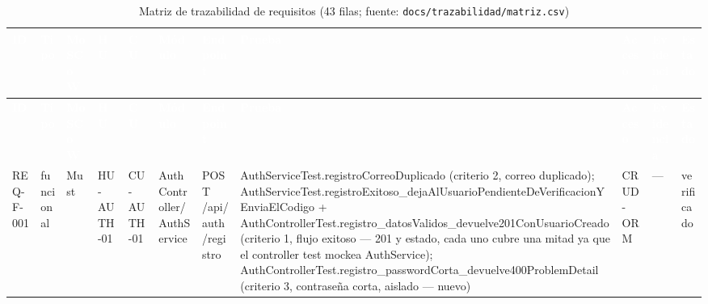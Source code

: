 \begin{landscape}
\begin{center}
\tiny
\renewcommand{\arraystretch}{1.05}
\setlength{\tabcolsep}{1pt}
\begin{longtable}{|p{1.2cm}|p{1.2cm}|p{1.35cm}|p{1.8cm}|p{1.5cm}|p{2.2cm}|p{2.3cm}|p{2.8cm}|p{1.8cm}|p{2.4cm}|p{1.8cm}|}
\caption{Matriz de trazabilidad de requisitos (43 filas; fuente:
  \texttt{docs/trazabilidad/matriz.csv})}
\label{tab:anexo-matriz}\\
\hline
\rowcolor{verdeuteq}
\textcolor{white}{\textbf{ID}} &
\textcolor{white}{\textbf{Tipo}} &
\textcolor{white}{\textbf{MoSCoW}} &
\textcolor{white}{\textbf{HU}} &
\textcolor{white}{\textbf{CU}} &
\textcolor{white}{\textbf{Módulo}} &
\textcolor{white}{\textbf{Endpoint}} &
\textcolor{white}{\textbf{Prueba}} &
\textcolor{white}{\textbf{Acceso}} &
\textcolor{white}{\textbf{Evidencia}} &
\textcolor{white}{\textbf{Estado}} \\
\hline
\endfirsthead
\hline
\rowcolor{verdeuteq}
\textcolor{white}{\textbf{ID}} &
\textcolor{white}{\textbf{Tipo}} &
\textcolor{white}{\textbf{MoSCoW}} &
\textcolor{white}{\textbf{HU}} &
\textcolor{white}{\textbf{CU}} &
\textcolor{white}{\textbf{Módulo}} &
\textcolor{white}{\textbf{Endpoint}} &
\textcolor{white}{\textbf{Prueba}} &
\textcolor{white}{\textbf{Acceso}} &
\textcolor{white}{\textbf{Evidencia}} &
\textcolor{white}{\textbf{Estado}} \\
\hline
\endhead
\hline
\endfoot
REQ-F-001 & funcional & Must & HU-AUTH-01 & CU-AUTH-01 & Auth\allowbreak Controller/\allowbreak Auth\allowbreak Service & POST /\allowbreak api/\allowbreak auth/\allowbreak registro & Auth\allowbreak Service\allowbreak Test.\allowbreak registro\allowbreak Correo\allowbreak Duplicado (criterio 2, correo duplicado); Auth\allowbreak Service\allowbreak Test.\allowbreak registro\allowbreak Exitoso\_\allowbreak deja\allowbreak Al\allowbreak Usuario\allowbreak Pendiente\allowbreak De\allowbreak Verificacion\allowbreak YEnvia\allowbreak El\allowbreak Codigo + Auth\allowbreak Controller\allowbreak Test.\allowbreak registro\_\allowbreak datos\allowbreak Validos\_\allowbreak devuelve201Con\allowbreak Usuario\allowbreak Creado (criterio 1, flujo exitoso --- 201 y estado, cada uno cubre una mitad ya que el controller test mockea Auth\allowbreak Service); Auth\allowbreak Controller\allowbreak Test.\allowbreak registro\_\allowbreak password\allowbreak Corta\_\allowbreak devuelve400Problem\allowbreak Detail (criterio 3, contraseña corta, aislado --- nuevo) & CRUD-ORM & --- & verificado \\

\end{longtable}
\end{center}
\end{landscape}
